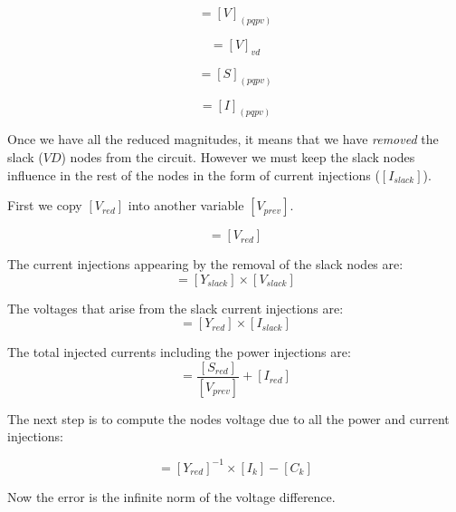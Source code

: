 \documentclass[nols,a4paper,twoside,notoc,fleqn]{tufte-book}
\begin{document}
\begin{equation}
[V_{red}] = [V]_{(pqpv)}
\end{equation}

\begin{equation}
[V_{slack}] = [V]_{vd}
\end{equation}

\begin{equation}
[S_{red}] = [S]_{(pqpv)}
\end{equation}

\begin{equation}
[I_{red}] = [I]_{(pqpv)}
\end{equation}

Once we have all the reduced magnitudes, it means that we have \textit{removed} the slack ($VD$) nodes from the circuit. However we must keep the slack nodes influence in the rest of the nodes in the form of current injections ($[I_{slack}]$).

First we copy $[V_{red}]$ into another variable $[V_{prev}]$.

\begin{equation}
[V_{prev}] = [V_{red}]
\end{equation}

The current injections appearing by the removal of the slack nodes are:
\begin{equation}
[I_{slack}] = [Y_{slack}] \times [V_{slack}]
\end{equation}

The voltages that arise from the slack current injections are:
\begin{equation}
[C_k] = [Y_{red}] \times [I_{slack}]
\end{equation}

The total injected currents including the power injections are:
\begin{equation}
[I_k] = \frac{[S_{red}]}{[V_{prev}]} + [I_{red}]
\label{eq:zm_ik}
\end{equation}

The next step is to compute the nodes voltage due to all the power and current injections:

\begin{equation}
[V_k] = [Y_{red}]^{-1} \times [I_k] - [C_k]
\end{equation}


Now the error is the infinite norm of the voltage difference.
\end{document}
